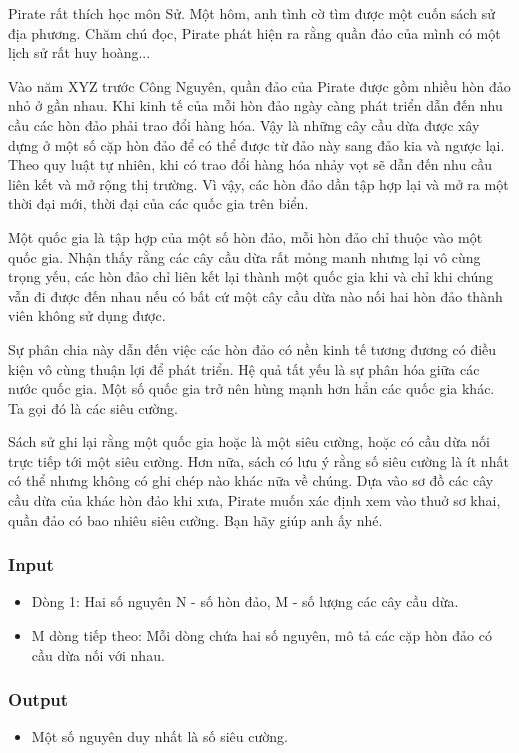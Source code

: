 



   Pirate rất thích học môn Sử. Một hôm, anh tình cờ tìm được một cuốn sách sử địa phương. Chăm chú đọc, Pirate phát hiện ra rằng quần đảo của mình có một lịch sử rất huy hoàng...  

   Vào năm XYZ trước Công Nguyên, quần đảo của Pirate được gồm nhiều hòn đảo nhỏ ở gần nhau. Khi kinh tế của mỗi hòn đảo ngày càng phát triển dẫn đến nhu cầu các hòn đảo phải trao đổi hàng hóa. Vậy là những cây cầu dừa được xây dựng ở một số cặp hòn đảo để có thể được từ đảo này sang đảo kia và ngược lại. Theo quy luật tự nhiên, khi có trao đổi hàng hóa nhảy vọt sẽ dẫn đến nhu cầu liên kết và mở rộng thị trường. Vì vậy, các hòn đảo dần tập hợp lại và mở ra một thời đại mới, thời đại của các quốc gia trên biển.  

   Một quốc gia là tập hợp của một số hòn đảo, mỗi hòn đảo chỉ thuộc vào một quốc gia. Nhận thấy rằng các cây cầu dừa rất mỏng manh nhưng lại vô cùng trọng yếu, các hòn đảo chỉ liên kết lại thành một quốc gia khi và chỉ khi chúng vẫn đi được đến nhau nếu có bất cứ một cây cầu dừa nào nối hai hòn đảo thành viên không sử dụng được.  

   Sự phân chia này dẫn đến việc các hòn đảo có nền kinh tế tương đương có điều kiện vô cùng thuận lợi để phát triển. Hệ quả tất yếu là sự phân hóa giữa các nước quốc gia. Một số quốc gia trở nên hùng mạnh hơn hẳn các quốc gia khác. Ta gọi đó là các siêu cường.  

   Sách sử ghi lại rằng một quốc gia hoặc là một siêu cường, hoặc có cầu dừa nối trực tiếp tới một siêu cường. Hơn nữa, sách có lưu ý rằng số siêu cường là ít nhất có thể nhưng không có ghi chép nào khác nữa về chúng. Dựa vào sơ đồ các cây cầu dừa của khác hòn đảo khi xưa, Pirate muốn xác định xem vào thuở sơ khai, quần đảo có bao nhiêu siêu cường. Bạn hãy giúp anh ấy nhé.  

\subsubsection{   Input  }
\begin{itemize}
	\item     Dòng 1: Hai số nguyên N - số hòn đảo, M - số lượng các cây cầu dừa.   
	\item     M dòng tiếp theo: Mỗi dòng chứa hai số nguyên, mô tả các cặp hòn đảo có cầu dừa nối với nhau.   
\end{itemize}

\subsubsection{   Output  }
\begin{itemize}
	\item     Một số nguyên duy nhất là số siêu cường.   
\end{itemize}

